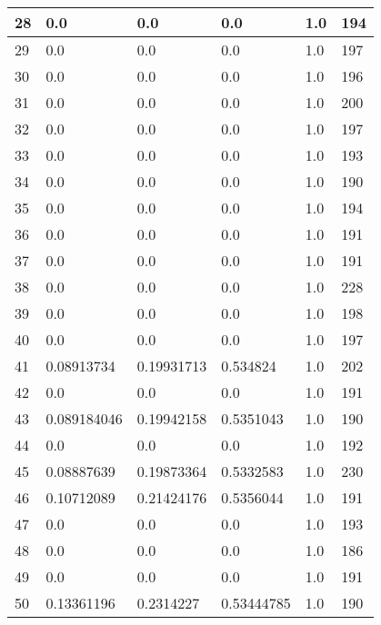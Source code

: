 \begin{longtable}{|l|l|l|l|l|l|}
28 & 0.0 & 0.0 & 0.0 & 1.0 & 194 \\ \hline 
29 & 0.0 & 0.0 & 0.0 & 1.0 & 197 \\ \hline 
30 & 0.0 & 0.0 & 0.0 & 1.0 & 196 \\ \hline 
31 & 0.0 & 0.0 & 0.0 & 1.0 & 200 \\ \hline 
32 & 0.0 & 0.0 & 0.0 & 1.0 & 197 \\ \hline 
33 & 0.0 & 0.0 & 0.0 & 1.0 & 193 \\ \hline 
34 & 0.0 & 0.0 & 0.0 & 1.0 & 190 \\ \hline 
35 & 0.0 & 0.0 & 0.0 & 1.0 & 194 \\ \hline 
36 & 0.0 & 0.0 & 0.0 & 1.0 & 191 \\ \hline 
37 & 0.0 & 0.0 & 0.0 & 1.0 & 191 \\ \hline 
38 & 0.0 & 0.0 & 0.0 & 1.0 & 228 \\ \hline 
39 & 0.0 & 0.0 & 0.0 & 1.0 & 198 \\ \hline 
40 & 0.0 & 0.0 & 0.0 & 1.0 & 197 \\ \hline 
41 & 0.08913734 & 0.19931713 & 0.534824 & 1.0 & 202 \\ \hline 
42 & 0.0 & 0.0 & 0.0 & 1.0 & 191 \\ \hline 
43 & 0.089184046 & 0.19942158 & 0.5351043 & 1.0 & 190 \\ \hline 
44 & 0.0 & 0.0 & 0.0 & 1.0 & 192 \\ \hline 
45 & 0.08887639 & 0.19873364 & 0.5332583 & 1.0 & 230 \\ \hline 
46 & 0.10712089 & 0.21424176 & 0.5356044 & 1.0 & 191 \\ \hline 
47 & 0.0 & 0.0 & 0.0 & 1.0 & 193 \\ \hline 
48 & 0.0 & 0.0 & 0.0 & 1.0 & 186 \\ \hline 
49 & 0.0 & 0.0 & 0.0 & 1.0 & 191 \\ \hline 
50 & 0.13361196 & 0.2314227 & 0.53444785 & 1.0 & 190 \\ \hline 
\end{longtable}